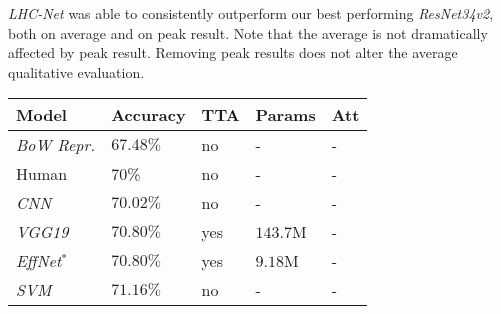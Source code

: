 \documentclass[fleqn,10pt]{SelfArx}
\begin{document}
\textit{LHC-Net} was able to consistently outperform our best performing \textit{ResNet34v2},  both on average and on peak result. Note that the average is not dramatically affected by peak result. Removing peak results does not alter the average qualitative evaluation. \begin{center}
\begin{tabular}{||p{2.2cm} | p{1.3cm} | p{0.7cm} | p{1.2cm} | p{0.8cm}||}  
\hline
\textbf{Model} & \textbf{Accuracy} & \textbf{TTA} & \textbf{Params} & \hspace{0.17cm}\textbf{Att}\\ 
\hline
\hline
\textit{BoW Repr.}\cite{FER2013}          & \hspace{0.15cm}$67.48\%$               & \hspace{0.17cm}no  & \hspace{0.5cm}-           & \hspace{0.4cm}-\\
\hline
\hline
Human \cite{FER2013}                         & \hspace{0.4cm}70\%                      & \hspace{0.15cm}no  & \hspace{0.5cm}-           & \hspace{0.4cm}- \\
\hline
\hline
\textit{CNN}\cite{minaee2021deep}       & \hspace{0.15cm}$70.02\%$               & \hspace{0.15cm}no   & \hspace{0.5cm}-          & \hspace{0.4cm}-\\
\hline
\hline
\textit{VGG19}\cite{resmaskingnet}       & \hspace{0.15cm}$70.80\%$               & \hspace{0.12cm}yes   & \hspace{0.05cm}$143.7$M & \hspace{0.4cm}-\\
\hline
\hline
\textit{EffNet}\cite{resmaskingnet}$^{*}$       & \hspace{0.15cm}$70.80\%$               & \hspace{0.12cm}yes   & \hspace{0.12cm}$9.18$M &\hspace{0.4cm}-\\
\hline
\hline
\textit{SVM}\cite{FER2013}                  & \hspace{0.15cm}$71.16\%$               & \hspace{0.15cm}no   & \hspace{0.5cm}- & \hspace{0.4cm}-\\

\end{tabular}
\end{center}
\end{document}
